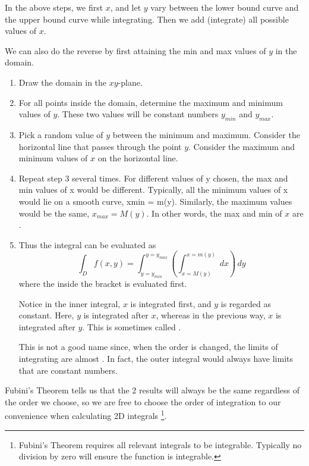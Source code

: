 \documentclass[11pt,fleqn]{book} %
\begin{document}
In the above steps, we first  $x$, and let $y$ vary between the lower bound curve and the upper bound curve while integrating. Then we add (integrate) all possible values of $x$.

We can also do the reverse by first attaining the min and max values of $y$ in the domain.

\begin{enumerate}
    \item Draw the domain in the $xy$-plane.

    \item For all points inside the domain, determine the maximum and minimum values of $y$. These two values will be constant numbers $y_{min}$ and $y_{max}$.

    \item Pick a random value of $y$ between the minimum and maximum. Consider the horizontal line that passes through the point $y$. Consider the maximum and minimum values of $x$ on the horizontal line. 

    \item Repeat step 3 several times. For different values of y chosen, the max and min values of x would be different. Typically, all the minimum values of x would lie on a smooth curve, xmin = m(y). Similarly, the maximum values would be the same, $x_{max} = M(y)$. In other words, the max and min of $x$ are .

    \item Thus the integral can be evaluated as $$\int_D f(x, y) = \int_{y=y_{min}}^{y=y_{max}} \left( \int_{x=M(y)}^{x=m(y)} \,dx \right) \,dy$$ where the  inside the bracket is evaluated first. 
    
    Notice in the inner integral, $x$ is integrated first, and $y$ is regarded as constant. Here, $y$ is integrated after $x$, whereas in the previous way, $x$ is integrated after $y$. This is sometimes called .

    This is not a good name since, when the order is changed, the limits of integrating are almost . In fact, the outer integral would always have limits that are constant numbers.
\end{enumerate}

Fubini's Theorem tells us that the 2 results will always be the same regardless of the order we choose, so we are free to choose the order of integration to our convenience when calculating 2D integrals \footnote{Fubini's Theorem requires all relevant integrals to be integrable. Typically no division by zero will ensure the function is integrable. }. 
\end{document}
